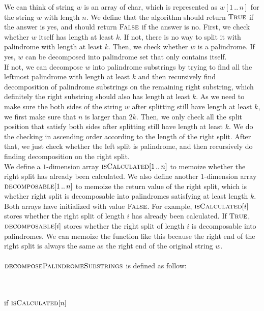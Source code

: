 \documentclass[11pt]{article}
\begin{document}
\begin{solution}
	We can think of string $w$ is an array of char, which is represented as $w[1\,..\,n]$ for the string $w$ with length $n$. We define that the algorithm should return $\textsc{True}$ if the answer is yes, and should return $\textsc{False}$ if the answer is no. First, we check whether $w$ itself has length at least $k$. If not, there is no way to split it with palindrome with length at least $k$. Then, we check whether $w$ is a palindrome. If yes, $w$ can be decomposed into palindrome set that only contains itself.\\
	If not, we can decompose $w$ into palindrome substrings by trying to find all the leftmost palindrome with length at least $k$ and then recursively find decomposition of palindrome substrings on the remaining right substring, which definitely the right substring should also has length at least $k$. As we need to make sure the both sides of the string $w$ after splitting still have length at least $k$, we first make sure that $n$ is larger than $2k$. Then, we only check all the split position that satisfy both sides after splitting still have length at least $k$. We do the checking in ascending order according to the length of the right split. After that, we just check whether the left split is palindrome, and then recursively do finding decomposition on the right split.\\
	We define a $1$-dimension array $\textsc{isCalculated}[1\,..\,n]$ to memoize whether the right split has already been calculated. We also define another $1$-dimension array $\textsc{decomposable}[1\,..\,n]$ to memoize the return value of the right split, which is whether right split is decomposable into palindromes satisfying at least length $k$. Both arrays have initialized with value $\textsc{False}$. For example, $\textsc{isCalculated}[i]$ stores whether the right split of length $i$ has already been calculated. If $\textsc{True}$, $\textsc{decomposable}[i]$ stores whether the right split of length $i$ is decomposable into palindromes. We can memoize the function like this because the right end of the right split is always the same as the right end of the original string $w$.\\ \\
\newpage
	$\textsc{decomposePalindromeSubstrings}$ is defined as follow:
\begin{algo}
	\+
\\[0.5ex]
\\	if $\textsc{isCalculated}[n]$\+

\end{algo}
\end{solution}
\end{document}
